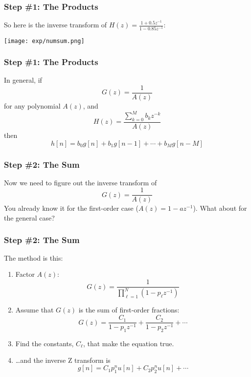 \documentclass{beamer}
\begin{document}
\begin{frame}
  \frametitle{Step \#1: The Products}

  So here is the inverse transform of $H(z)=\frac{1+0.5z^{-1}}{1-0.85z^{-1}}$:
  \centerline{\texttt{[image: exp/numsum.png]}}
\end{frame}

\begin{frame}
  \frametitle{Step \#1: The Products}

  In general, if 
  \begin{displaymath}
    G(z) = \frac{1}{A(z)}
  \end{displaymath}
  for any polynomial $A(z)$, and
  \begin{displaymath}
    H(z) = \frac{\sum_{k=0}^M b_kz^{-k}}{A(z)}
  \end{displaymath}
  then
  \begin{displaymath}
    h[n] = b_0 g[n]+b_1g[n-1]+\cdots+b_M g[n-M]
  \end{displaymath}
\end{frame}

\begin{frame}
  \frametitle{Step \#2: The Sum}

  Now we need to figure out the inverse transform of
  \begin{displaymath}
    G(z) = \frac{1}{A(z)}
  \end{displaymath}
  You already know it for the first-order case ($A(z)=1-az^{-1}$).
  What about for the general case?
\end{frame}

\begin{frame}
  \frametitle{Step \#2: The Sum}
  The method is this:
  \begin{enumerate}
  \item Factor $A(z)$:
    \begin{displaymath}
      G(z) = \frac{1}{\prod_{\ell=1}^N \left(1-p_\ell z^{-1}\right)}
    \end{displaymath}
  \item Assume that $G(z)$ is the sum of first-order fractions:
    \begin{displaymath}
      G(z) = \frac{C_1}{1-p_1z^{-1}} + \frac{C_2}{1-p_2z^{-1}} + \cdots
    \end{displaymath}
  \item Find the constants, $C_\ell$, that make the equation true.
  \item \ldots and the inverse Z transform is
    \[
    g[n] = C_1 p_1^n u[n] + C_2 p_2^n u[n] + \cdots
    \]
  \end{enumerate}
\end{frame}
\end{document}
